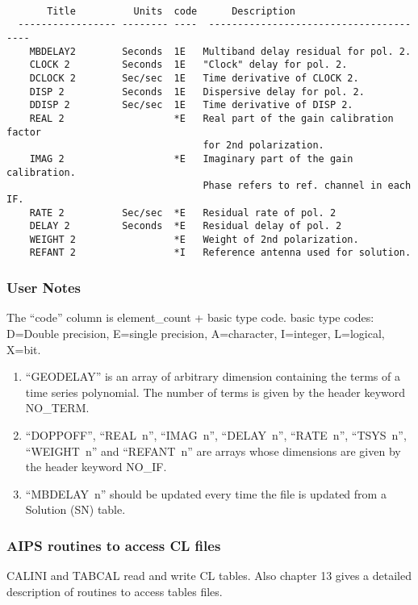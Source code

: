 \begin{verbatim}

       Title          Units  code      Description
  ----------------- -------- ----  ---------------------------------------
    MBDELAY2        Seconds  1E   Multiband delay residual for pol. 2.
    CLOCK 2         Seconds  1E   "Clock" delay for pol. 2.
    DCLOCK 2        Sec/sec  1E   Time derivative of CLOCK 2.
    DISP 2          Seconds  1E   Dispersive delay for pol. 2.
    DDISP 2         Sec/sec  1E   Time derivative of DISP 2.
    REAL 2                   *E   Real part of the gain calibration factor
                                  for 2nd polarization.
    IMAG 2                   *E   Imaginary part of the gain calibration.
                                  Phase refers to ref. channel in each IF.
    RATE 2          Sec/sec  *E   Residual rate of pol. 2
    DELAY 2         Seconds  *E   Residual delay of pol. 2
    WEIGHT 2                 *E   Weight of 2nd polarization.
    REFANT 2                 *I   Reference antenna used for solution.
\end{verbatim}


\subsubsection{User Notes}
  The ``code'' column is element\_count + basic type code.
basic type codes: D=Double precision, E=single precision,
   A=character, I=integer, L=logical, X=bit.
\begin{enumerate}
\item ``GEODELAY'' is an array of arbitrary dimension containing the
terms of a time series polynomial.  The number of terms is given by
the header keyword NO\_TERM.
\item ``DOPPOFF'', ``REAL~n'', ``IMAG~n'', ``DELAY~n'',
``RATE~n'', ``TSYS~n'', ``WEIGHT~n'' and ``REFANT~n''
 are arrays whose dimensions are given by the header keyword NO\_IF.
\item ``MBDELAY~n'' should be updated every time the file
is updated from a Solution (SN) table.
\end{enumerate}


\subsubsection{AIPS routines to access CL files}
     CALINI and TABCAL read and write CL
tables.  Also chapter 13 gives a detailed description of routines to
access tables files.

